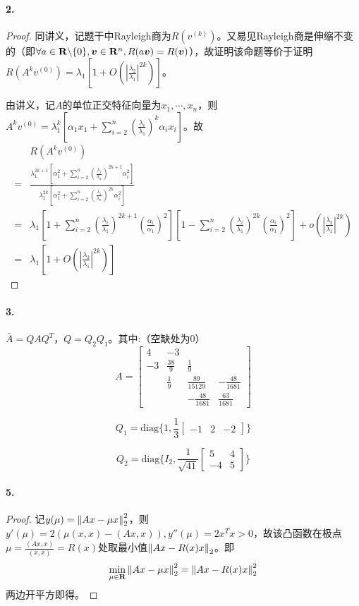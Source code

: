 \documentclass{ctexart}
\begin{document}
\paragraph{2.}
\begin{proof}
同讲义，记题干中Rayleigh商为$R(v^{(k)})$。又易见Rayleigh商是伸缩不变的（即$\forall a\in\mathbf{R}\backslash \{0\},\bm{v}\in\mathbf{R}^n,R(a\bm{v})=R(\bm{v})$），故证明该命题等价于证明$R(A^kv^{(0)})=\lambda_1[1+O(|\frac{\lambda_2}{\lambda_1}|^{2k})]$。

由讲义，记$A$的单位正交特征向量为$x_1,\cdots,x_n$，则$A^kv^{(0)}=\lambda_1^k[\alpha_1 x_1+\sum^n_{i=2}(\frac{\lambda_i}{\lambda_1})^k\alpha_i x_i]$。故
\begin{align*}
&R(A^kv^{(0)})\\
=&\frac{\lambda_1^{2k+1}[\alpha_1^2+\sum_{i=2}^n (\frac{\lambda_i}{\lambda_n})^{2k+1}\alpha_i^2]}{\lambda_1^{2k}[\alpha_1^2+\sum_{i=2}^n (\frac{\lambda_i}{\lambda_n})^{2k}\alpha_i^2]}\\
=&\lambda_1[1+\sum_{i=2}^n (\frac{\lambda_i}{\lambda_1})^{2k+1}(\frac{\alpha_i}{\alpha_1})^2][1-\sum_{i=2}^n (\frac{\lambda_i}{\lambda_1})^{2k}(\frac{\alpha_i}{\alpha_1})^2]+o(|\frac{\lambda_2}{\lambda_1}|^{2k})\\
=&\lambda_1[1+O(|\frac{\lambda_2}{\lambda_1}|^{2k})]
\end{align*}
\end{proof}

\paragraph{3.}
$\bar{A}=QAQ^T$，$Q=Q_2Q_1$。其中:（空缺处为0）
\[A=\begin{bmatrix}4&-3& &\\ -3&\frac{38}{9}&\frac{1}{9}&\\ &\frac{1}{9}&\frac{89}{15129}&-\frac{48}{1681}\\&&-\frac{48}{1681}&\frac{63}{1681}\end{bmatrix}\]

\[Q_1=\mathrm{diag}\{1,\frac{1}{3}\begin{bmatrix}-1&2&-2\end{bmatrix}\}\]

\[Q_2=\mathrm{diag}\{I_2,\frac{1}{\sqrt{41}}\begin{bmatrix}5&4\\-4&5\end{bmatrix}\}\]

\paragraph{5.}
\begin{proof}
记$y(\mu)=\left\|Ax-\mu x\right\|^2_2$，则$y'(\mu)=2(\mu (x,x)-(Ax,x)),y''(\mu)=2x^Tx>0$，故该凸函数在极点$\mu=\frac{(Ax,x)}{(x,x)}=R(x)$处取最小值$\left\|Ax-R(x)x\right\|_2$。即
\[\min_{\mu\in\mathbf{R}}\left\|Ax-\mu x\right\|_2^2=\left\|Ax-R(x)x\right\|^2_2\]
两边开平方即得。
\end{proof}
\end{document}
